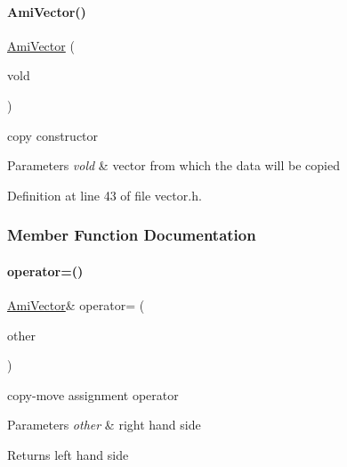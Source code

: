 \paragraph{\texorpdfstring{Ami\+Vector()}{AmiVector()}\hspace{0.1cm}{\footnotesize\ttfamily [3/3]}}
{\footnotesize\ttfamily \mbox{\hyperlink{classamici_1_1_ami_vector}{Ami\+Vector}} (\begin{DoxyParamCaption}\item[{const \mbox{\hyperlink{classamici_1_1_ami_vector}{Ami\+Vector}} \&}]{vold }\end{DoxyParamCaption})}

copy constructor 
\begin{DoxyParams}{Parameters}
{\em vold} & vector from which the data will be copied \\
\hline
\end{DoxyParams}


Definition at line 43 of file vector.\+h.



\subsubsection{Member Function Documentation}
\mbox{\label{classamici_1_1_ami_vector_a7a677e5cfe8a63b315bd2fdf7992ede7}} 
\paragraph{\texorpdfstring{operator=()}{operator=()}}
{\footnotesize\ttfamily \mbox{\hyperlink{classamici_1_1_ami_vector}{Ami\+Vector}}\& operator= (\begin{DoxyParamCaption}\item[{\mbox{\hyperlink{classamici_1_1_ami_vector}{Ami\+Vector}} \&}]{other }\end{DoxyParamCaption})}

copy-\/move assignment operator 
\begin{DoxyParams}{Parameters}
{\em other} & right hand side \\
\hline
\end{DoxyParams}
\begin{DoxyReturn}{Returns}
left hand side 
\end{DoxyReturn}


